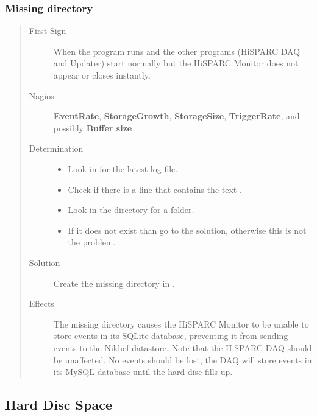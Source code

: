 \documentclass[a4paper,11pt,english]{sphinxmanual}
\begin{document}
\subsubsection{Missing directory}
\label{known-issues:missing-directory}\begin{quote}\begin{description}
\item[{First Sign}] \leavevmode
When the  program runs and the other programs (HiSPARC DAQ and Updater) start normally but the HiSPARC Monitor does not appear or closes instantly.

\item[{Nagios}] \leavevmode
\textbf{EventRate}, \textbf{StorageGrowth}, \textbf{StorageSize}, \textbf{TriggerRate}, and possibly \textbf{Buffer size}

\item[{Determination}] \leavevmode\begin{itemize}
\item {} 
Look in  for the latest log file.

\item {} 
Check if there is a line that contains the text .

\item {} 
Look in the  directory for a  folder.

\item {} 
If it does not exist than go to the solution, otherwise this is not the problem.

\end{itemize}

\item[{Solution}] \leavevmode
Create the missing  directory in .

\item[{Effects}] \leavevmode
The missing directory causes the HiSPARC Monitor to be unable to store events in its SQLite database, preventing it from sending events to the Nikhef datastore. Note that the HiSPARC DAQ should be unaffected. No events should be lost, the DAQ will store events in its MySQL database until the hard disc fills up.

\end{description}\end{quote}


\subsection{Hard Disc Space}
\label{known-issues:hard-disc-space}
\end{document}
